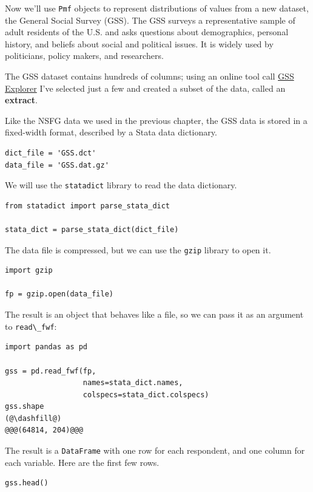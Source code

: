 Now we'll use \passthrough{\lstinline!Pmf!} objects to represent
distributions of values from a new dataset, the General Social Survey
(GSS). The GSS surveys a representative sample of adult residents of the
U.S. and asks questions about demographics, personal history, and
beliefs about social and political issues. It is widely used by
politicians, policy makers, and researchers.

The GSS dataset contains hundreds of columns; using an online tool call
\href{https://gssdataexplorer.norc.org/}{GSS Explorer} I've selected
just a few and created a subset of the data, called an \textbf{extract}.

Like the NSFG data we used in the previous chapter, the GSS data is
stored in a fixed-width format, described by a Stata data dictionary.

\begin{lstlisting}[]
dict_file = 'GSS.dct'
data_file = 'GSS.dat.gz'
\end{lstlisting}

We will use the \passthrough{\lstinline!statadict!} library to read the
data dictionary.

\begin{lstlisting}[]
from statadict import parse_stata_dict

stata_dict = parse_stata_dict(dict_file)
\end{lstlisting}

The data file is compressed, but we can use the
\passthrough{\lstinline!gzip!} library to open it.

\begin{lstlisting}[]
import gzip

fp = gzip.open(data_file)
\end{lstlisting}

The result is an object that behaves like a file, so we can pass it as
an argument to \passthrough{\lstinline!read\_fwf!}:

\begin{lstlisting}[]
import pandas as pd

gss = pd.read_fwf(fp, 
                  names=stata_dict.names, 
                  colspecs=stata_dict.colspecs)
gss.shape
(@\dashfill@)
@@@(64814, 204)@@@
\end{lstlisting}

The result is a \passthrough{\lstinline!DataFrame!} with one row for
each respondent, and one column for each variable. Here are the first
few rows.

\begin{lstlisting}[]
gss.head()
\end{lstlisting}

